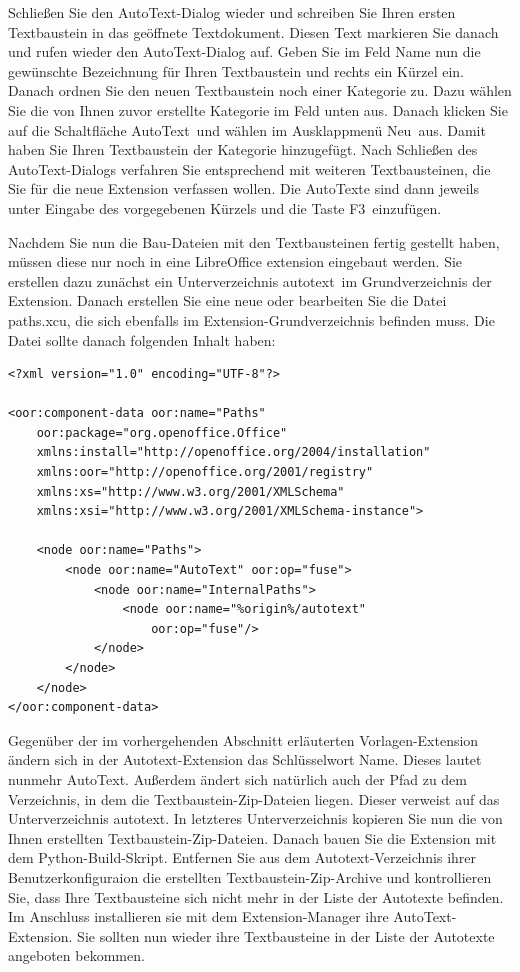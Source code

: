 \documentclass[a4paper,10pt,pagesize,titlepage]{scrbook}
\begin{document}
Schließen Sie den AutoText-Dialog wieder und schreiben Sie Ihren ersten Textbaustein in das geöffnete Textdokument. Diesen Text markieren Sie danach und rufen wieder den AutoText-Dialog auf. Geben Sie im Feld Name nun die gewünschte Bezeichnung für Ihren Textbaustein und rechts ein Kürzel ein. Danach ordnen Sie den neuen Textbaustein noch einer Kategorie zu. Dazu wählen Sie die von Ihnen zuvor erstellte Kategorie im Feld unten aus. Danach klicken Sie auf die Schaltfläche \glqq AutoText\grqq~und wählen im Ausklappmenü \glqq Neu\grqq~aus. Damit haben Sie Ihren Textbaustein der Kategorie hinzugefügt. Nach Schließen des AutoText-Dialogs verfahren Sie entsprechend mit weiteren Textbausteinen, die Sie für die neue Extension verfassen wollen. Die AutoTexte sind dann jeweils unter Eingabe des vorgegebenen Kürzels und die Taste \glqq F3\grqq~einzufügen.

Nachdem Sie nun die Bau-Dateien mit den Textbausteinen fertig gestellt haben, müssen diese nur noch in eine LibreOffice extension eingebaut werden. Sie erstellen dazu zunächst ein Unterverzeichnis \glqq autotext\grqq~im Grundverzeichnis der Extension. Danach erstellen Sie eine neue oder bearbeiten Sie die Datei \glqq paths.xcu\grqq, die sich ebenfalls im Extension-Grundverzeichnis befinden muss. Die Datei sollte danach folgenden Inhalt haben:


\begin{lstlisting}
<?xml version="1.0" encoding="UTF-8"?>

<oor:component-data oor:name="Paths" 
    oor:package="org.openoffice.Office" 
    xmlns:install="http://openoffice.org/2004/installation" 
    xmlns:oor="http://openoffice.org/2001/registry"
    xmlns:xs="http://www.w3.org/2001/XMLSchema" 
    xmlns:xsi="http://www.w3.org/2001/XMLSchema-instance">

    <node oor:name="Paths">
        <node oor:name="AutoText" oor:op="fuse">
            <node oor:name="InternalPaths">
                <node oor:name="%origin%/autotext" 
                    oor:op="fuse"/>
            </node>
        </node>
    </node>
</oor:component-data>
\end{lstlisting}

Gegenüber der im vorhergehenden Abschnitt erläuterten Vorlagen-Extension ändern sich in der Autotext-Extension das Schlüsselwort Name. Dieses lautet nunmehr \glqq AutoText\grqq. Außerdem ändert sich natürlich auch der Pfad zu dem Verzeichnis, in dem die Textbaustein-Zip-Dateien liegen. Dieser verweist auf das Unterverzeichnis \glqq autotext\grqq. In letzteres Unterverzeichnis kopieren Sie nun die von Ihnen erstellten Textbaustein-Zip-Dateien. Danach bauen Sie die Extension mit dem Python-Build-Skript. Entfernen Sie aus dem Autotext-Verzeichnis ihrer Benutzerkonfiguraion die erstellten Textbaustein-Zip-Archive und kontrollieren Sie, dass Ihre Textbausteine sich nicht mehr in der Liste der Autotexte befinden. Im Anschluss installieren sie mit dem Extension-Manager ihre AutoText-Extension. Sie sollten nun wieder ihre Textbausteine in der Liste der Autotexte angeboten bekommen.
\end{document}
